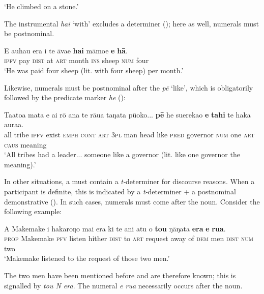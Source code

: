 \glt 
‘He climbed on a stone.’ \textstyleExampleref{[R229.347]} 
\z

The instrumental  \textit{hai} ‘with’ excludes a determiner (); here as well, numerals must be postnominal.

\ea\label{ex:5.65}
\gll E {\ꞌ}auhau era {\ꞌ}i te {\ꞌ}āva{\ꞌ}e \textbf{hai} māmoe \textbf{e} \textbf{hā}. \\
\textsc{ipfv} pay \textsc{dist} at \textsc{art} month \textsc{ins} sheep \textsc{num} four \\

\glt
‘He was paid four sheep (lit. with four sheep) per month.’ \textstyleExampleref{[R250.053]} 
\z

Likewise, numerals must be postnominal after the  \textit{pē} ‘like’, which is obligatorily followed by the predicate marker \textit{he} ():

\ea\label{ex:5.66}
\gll Ta{\ꞌ}ato{\ꞌ}a mata e ai rō {\ꞌ}ana te rāua taŋata pū{\ꞌ}oko... \textbf{pē} he suerekao  \textbf{e} \textbf{tahi} te haka aura{\ꞌ}a.\\
all tribe \textsc{ipfv} exist \textsc{emph} \textsc{cont} \textsc{art} \textsc{3pl} man head like \textsc{pred} governor  \textsc{num} one \textsc{art} \textsc{caus} meaning\\

\glt 
‘All tribes had a leader... someone like a governor (lit. like one governor the meaning).’ \textstyleExampleref{[R371.006]} 
\z

In other situations, a  must contain a \textit{t-}determiner for discourse reasons. When a participant is definite, this is indicated by a \textit{t-}determiner + a postnominal demonstrative (). In such cases, numerals must come after the noun. Consider the following example: 

\ea\label{ex:5.67}
\gll A Makemake i hakaroŋo mai era ki te ani atu o \textbf{tou} ŋāŋata \textbf{era}  \textbf{e} \textbf{rua}.\\
\textsc{prop} Makemake \textsc{pfv} listen hither \textsc{dist} to \textsc{art} request away of \textsc{dem} men \textsc{dist}  \textsc{num} two\\

\glt
‘Makemake listened to the request of those two men.’ \textstyleExampleref{[Fel-40.044]}
\z

The two men have been mentioned before and are therefore known; this is signalled by  \textit{tou N era}. The numeral \textit{e rua} necessarily occurs after the noun.

